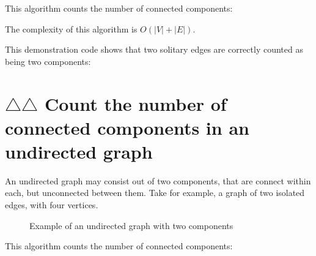 This algorithm counts the number of connected components:



The complexity of this algorithm is 
$O(\left|V\right|+\left|E\right|)$.

This demonstration code shows that two solitary edges are correctly counted
as being two components:



\section{$\triangle$$\triangle$ Count the number of connected components in an undirected graph}
\label{subsec:count_undirected_graph_connected_components}

An undirected graph may consist out of two components, that are connect
within each, but unconnected between them.
Take for example, a graph of two isolated edges, with four vertices.

\begin{figure}
  \caption{Example of an undirected graph with two components}
  \label{fig:count_undirected_graph_connected_components}
\end{figure}

This algorithm counts the number of connected components:



